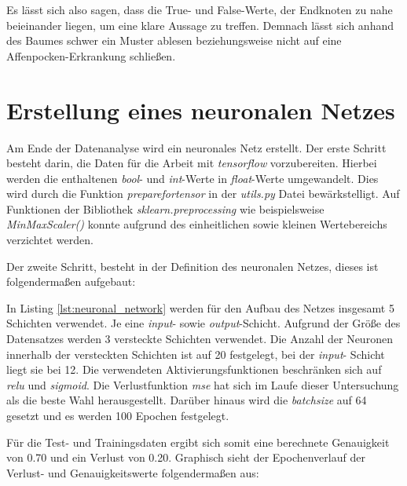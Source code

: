 \documentclass[13pt,a4paper, listof=entryprefix, bibliography=totocnumbered,toc=listofnumbered,lof=listofnumbered]{scrartcl}
\begin{document}
Es lässt sich also sagen, dass die True- und False-Werte, der Endknoten zu nahe beieinander liegen, um eine klare Aussage zu treffen. 
Demnach lässt sich anhand des Baumes schwer ein Muster ablesen beziehungsweise nicht auf eine Affenpocken-Erkrankung schließen.  

	\section{Erstellung eines neuronalen Netzes}
		\label{ch:neuronlaes_netz}

Am Ende der Datenanalyse wird ein neuronales Netz erstellt. Der erste Schritt besteht darin, die Daten für die Arbeit mit 
\textit{tensorflow} vorzubereiten. Hierbei werden die enthaltenen \textit{bool}- und \textit{int}-Werte in 
\textit{float}-Werte umgewandelt. Dies wird durch die Funktion \textit{prepare\textunderscore for\textunderscore tensor}
in der \textit{utils.py} Datei bewärkstelligt. Auf Funktionen der Bibliothek \textit{sklearn.preprocessing} wie 
beispielsweise \textit{MinMaxScaler()} konnte aufgrund des einheitlichen sowie kleinen Wertebereichs verzichtet werden. 

Der zweite Schritt, besteht in der Definition des neuronalen Netzes, dieses ist folgendermaßen aufgebaut:

	

In Listing \ref{lst:neuronal_network} werden für den Aufbau des Netzes insgesamt 5
Schichten verwendet. Je eine \textit{input}- sowie \textit{output}-Schicht. Aufgrund der 
Größe des Datensatzes werden 3 versteckte Schichten verwendet.
Die Anzahl der Neuronen innerhalb der versteckten Schichten ist auf 20 festgelegt, bei der \textit{input}-
Schicht liegt sie bei 12. Die verwendeten Aktivierungsfunktionen beschränken sich auf \textit{relu} und 
\textit{sigmoid}. Die Verlustfunktion \textit{mse} hat sich im Laufe dieser Untersuchung als die beste Wahl herausgestellt.
Darüber hinaus wird die \textit{batch\textunderscore size} auf 64 gesetzt und es werden 100 Epochen festgelegt. 

Für die Test- und Trainingsdaten ergibt sich somit eine berechnete Genauigkeit von 0.70 und ein Verlust von 0.20. Graphisch sieht der Epochenverlauf der Verlust- und 
Genauigkeitswerte folgendermaßen aus: 
\end{document}

